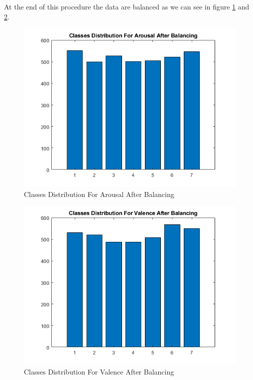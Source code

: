 \documentclass[a4paper]{report}
\begin{document}
\noindent At the end of this procedure the data are balanced as we can see in figure \ref{afterBalancingArousal} and \ref{afterBalancingValence}.

	\begin{figure}[htbp]
		\centering
		\includegraphics[scale=0.7]{img/afterBalancingArousal.png}
		\caption{Classes Distribution For Arousal After Balancing}
		\label{afterBalancingArousal}
	\end{figure}  
	
		\begin{figure}[htbp]
		\centering
		\includegraphics[scale=0.7]{img/afterBalancingValence.png}
		\caption{Classes Distribution For Valence After Balancing}
		\label{afterBalancingValence}
	\end{figure}
	
\end{document}
